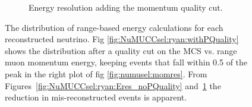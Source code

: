 \begin{figure}[]
\begin{center}
\begin{subfigure}[b]{0.45\textwidth}
    \caption{\label{fig:NuMUCCsel:ryan:Eres_withPQuality} Energy resolution adding the momentum quality cut.}
    \end{subfigure}
\caption{The distribution of range-based energy calculations for each reconstructed neutrino. Fig \ref{fig:NuMUCCsel:ryan:withPQuality} shows the distribution after a quality cut on the MCS vs. range muon momentum energy, keeping events that fall within 0.5 of the peak in the right plot of fig \ref{fig:numusel:momres}. From Figures~\ref{fig:NuMUCCsel:ryan:Eres_noPQuality} and~\ref{fig:NuMUCCsel:ryan:Eres_withPQuality} the reduction in mis-reconstructed events is apparent.}
\label{fig:NuMUCCsel:ryan:PQuality}
\end{center}
\end{figure}

